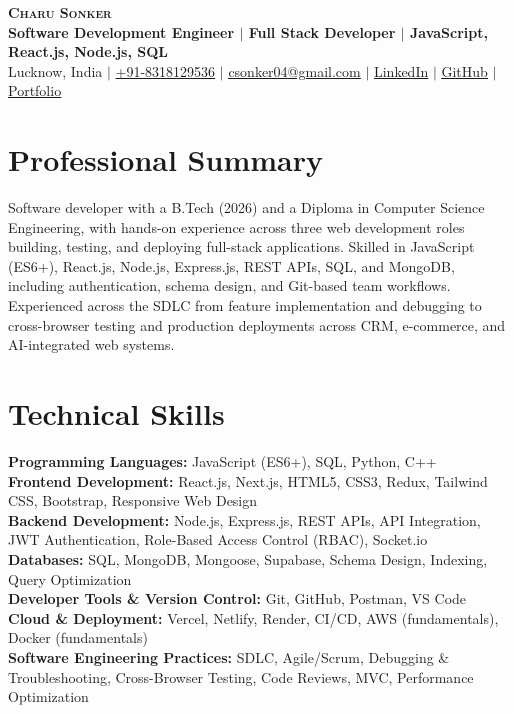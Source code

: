 \documentclass[a4paper,10pt]{article}
\begin{document}
\begin{center}
    \textbf{\Large \scshape Charu Sonker} \\ \vspace{2pt}
    \small \textbf{Software Development Engineer $|$ Full Stack Developer $|$ JavaScript, React.js, Node.js, SQL} \\ \vspace{2pt}
    \small Lucknow, India $|$ \href{tel:+918318129536}{+91-8318129536} $|$ \href{mailto:csonker04@gmail.com}{\underline{csonker04@gmail.com}} $|$ 
    \href{https://www.linkedin.com/in/charu-sonker-196910250}{\underline{LinkedIn}} $|$
    \href{https://github.com/Charu-web}{\underline{GitHub}} $|$
    \href{https://charu-web.github.io/}{\underline{Portfolio}}
\end{center}

\section{Professional Summary}
\small{Software developer with a B.Tech (2026) and a Diploma in Computer Science Engineering, with hands-on experience across three web development roles building, testing, and deploying full-stack applications. Skilled in JavaScript (ES6+), React.js, Node.js, Express.js, REST APIs, SQL, and MongoDB, including authentication, schema design, and Git-based team workflows. Experienced across the SDLC from feature implementation and debugging to cross-browser testing and production deployments across CRM, e-commerce, and AI-integrated web systems.}

\section{Technical Skills}
 \begin{itemize}[leftmargin=0.15in, label={}]
    \small{\item{
     \textbf{Programming Languages:} JavaScript (ES6+), SQL, Python, C++ \\
     \textbf{Frontend Development:} React.js, Next.js, HTML5, CSS3, Redux, Tailwind CSS, Bootstrap, Responsive Web Design \\
     \textbf{Backend Development:} Node.js, Express.js, REST APIs, API Integration, JWT Authentication, Role-Based Access Control (RBAC), Socket.io \\
     \textbf{Databases:} SQL, MongoDB, Mongoose, Supabase, Schema Design, Indexing, Query Optimization \\
     \textbf{Developer Tools \& Version Control:} Git, GitHub, Postman, VS Code \\
     \textbf{Cloud \& Deployment:} Vercel, Netlify, Render, CI/CD, AWS (fundamentals), Docker (fundamentals) \\
     \textbf{Software Engineering Practices:} SDLC, Agile/Scrum, Debugging \& Troubleshooting, Cross-Browser Testing, Code Reviews, MVC, Performance Optimization
    }}
 \end{itemize}
\end{document}

